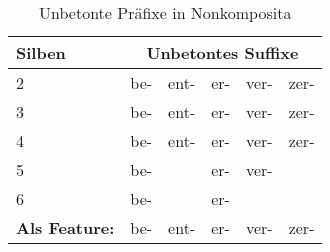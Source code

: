 \begin{table}[h]
\centering
\caption{Unbetonte Präfixe in Nonkomposita}
\begin{tabular}{|l|lllll|}
\hline
{\bf Silben}       & \multicolumn{5}{c|}{{\bf Unbetontes Suffixe}} \\ \hline
2                  & be-     & ent-   & er-   & ver-   & zer-   \\
3                  & be-     & ent-   & er-   & ver-   & zer-   \\
4                  & be-     & ent-   & er-   & ver-   & zer-   \\
5                  & be-     &        & er-   & ver-   &        \\
6                  & be-     &        & er-   &        &        \\ \hline
{\bf Als Feature:} & be-     & ent-   & er-   & ver-   & zer-  \\ \hline
\end{tabular}
\end{table}
